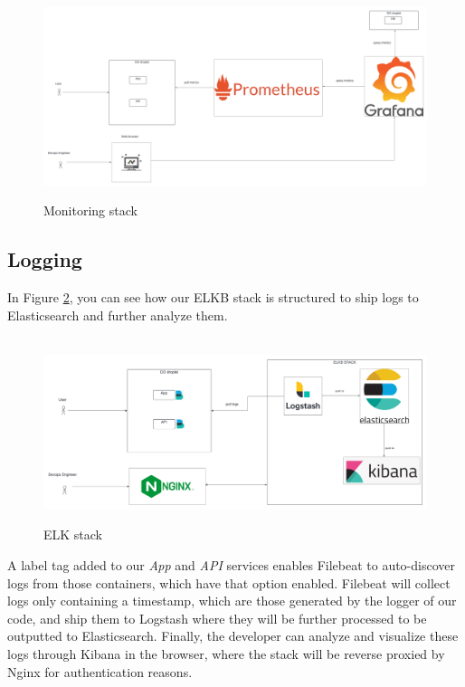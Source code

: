 \documentclass[12pt, a4paper, oneside]{book}
\begin{document}
\begin{figure}[H]
    \centering
    \hbox{\hspace{-5em}
    \includegraphics[scale = 0.3]{images/grafana.png}}
    \caption{Monitoring stack}
    \label{fig:monitoring-stack}
\end{figure}

\subsection{Logging}\label{sec:logging-architecture}

In Figure \ref{fig:elk-stack}, you can see how our ELKB stack is structured to ship logs to Elasticsearch and further analyze them.
\begin{figure}[H]
    \centering
    \hbox{\hspace{-6em}
    \includegraphics[scale = 0.37]{images/elk.png}}
    \caption{ELK stack}
    \label{fig:elk-stack}
\end{figure}

A label tag added to our \textit{App} and \textit{API} services enables Filebeat to auto-discover logs from those containers, which have that option enabled. Filebeat will collect logs only containing a timestamp, which are those generated by the logger of our code, and ship them to Logstash where they will be further processed to be outputted to Elasticsearch.
Finally, the developer can analyze and visualize these logs through Kibana in the browser, where the stack will be reverse proxied by Nginx for authentication reasons. \bigskip
\end{document}
